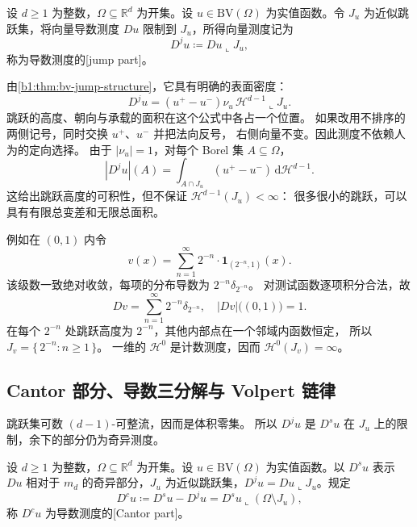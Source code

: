 \begin{definition}\label{b1:def:bv-jump-derivative}
设 \(d\ge1\) 为整数，\(\Omega\subseteq\mathbb R^d\) 为开集。设 \(u\in\mathrm{BV}(\Omega)\) 为实值函数。令 \(J_u\) 为近似跳跃集，将向量导数测度 \(Du\) 限制到 \(J_u\)，所得向量测度记为
\[
 D^ju\coloneqq Du\mathbin{\llcorner}J_u,
\]
称为导数测度的[jump part]。
\end{definition}

由\cref{b1:thm:bv-jump-structure}，它具有明确的表面密度：
\begin{equation}\label{b1:eq:bv-jump-density}
 D^ju=(u^+-u^-)\nu_u\,
       \mathcal H^{d-1}\mathbin{\llcorner}J_u.
\end{equation}
跳跃的高度、朝向与承载的面积在这个公式中各占一个位置。
如果改用不排序的两侧记号，同时交换 \(u^+\)、\(u^-\) 并把法向反号，
右侧向量不变。因此测度不依赖人为的定向选择。
由于 \(|\nu_u|=1\)，对每个 Borel 集 \(A\subseteq\Omega\)，
\[
 |D^ju|(A)=\int_{A\cap J_u}(u^+-u^-)\,\mathrm d\mathcal H^{d-1}.
\]
这给出跳跃高度的可积性，但不保证 \(\mathcal H^{d-1}(J_u)<\infty\)：
很多很小的跳跃，可以具有有限总变差和无限总面积。

\ProseParagraphBreak

例如在 \((0,1)\) 内令
\[
 v(x)=\sum_{n=1}^{\infty}2^{-n}\cdot\mathbf1_{(2^{-n},1)}(x).
\]
该级数一致绝对收敛，每项的分布导数为 \(2^{-n}\delta_{2^{-n}}\)。
对测试函数逐项积分合法，故
\[
 Dv=\sum_{n=1}^{\infty}2^{-n}\delta_{2^{-n}},
 \quad |Dv|\bigl((0,1)\bigr)=1.
\]
在每个 \(2^{-n}\) 处跳跃高度为 \(2^{-n}\)，其他内部点在一个邻域内函数恒定，
所以 \(J_v=\{\,2^{-n}:n\ge1\,\}\)。
一维的 \(\mathcal H^0\) 是计数测度，因而 \(\mathcal H^0(J_v)=\infty\)。

\subsection{Cantor 部分、导数三分解与 Volpert 链律}
\label{b1:subsec:280303}

跳跃集可数 \((d-1)\)-可整流，因而是体积零集。
所以 \(D^ju\) 是 \(D^su\) 在 \(J_u\) 上的限制，余下的部分仍为奇异测度。

\begin{definition}\label{b1:def:bv-cantor-derivative}
设 \(d\ge1\) 为整数，\(\Omega\subseteq\mathbb R^d\) 为开集。设 \(u\in\mathrm{BV}(\Omega)\) 为实值函数。以 \(D^su\) 表示 \(Du\) 相对于 \(m_d\) 的奇异部分，\(J_u\) 为近似跳跃集，\(D^ju=Du\llcorner J_u\)。规定
\[
 D^cu\coloneqq D^su-D^ju
     =D^su\mathbin{\llcorner}(\Omega\setminus J_u),
\]
称 \(D^cu\) 为导数测度的[Cantor part]。
\end{definition}

